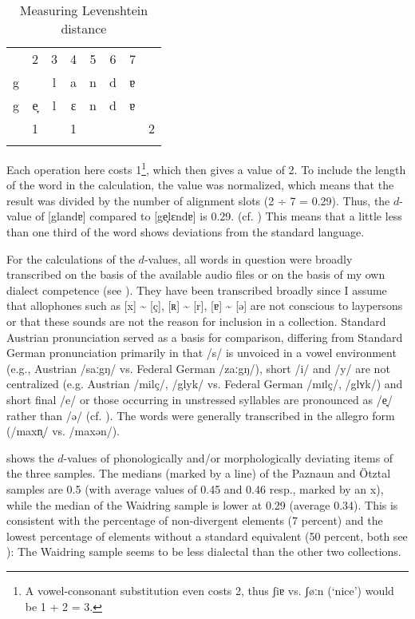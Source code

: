 \documentclass[output=paper]{langscibook}
\begin{document}
\begin{table}
\begin{tabular}{cccccccc}
\lsptoprule
1 & 2 & 3 & 4 & 5 & 6 & 7 & \\
g &  & l & a & n & d & ɐ & \\
g & e̞ & l & ɛ & n & d & ɐ & \\
\midrule
& 1 &  & 1 &  &  &  & 2\\
\lspbottomrule
\end{tabular}
\caption{\label{tab:kathrein:8} Measuring Levenshtein distance}
\end{table}

Each operation here costs 1\footnote{A vowel-consonant substitution even costs 2, thus ʃiɐ vs. ʃøːn (‘nice’) would be 1 + 2 = 3.}, which then gives a value of 2. To include the length of the word in the calculation, the value was normalized, which means that the result was divided by the number of alignment slots (2 ÷ 7 = 0.29). Thus, the $d$-value of [glandɐ] compared to [ge̞lɛndɐ] is 0.29. (cf. \citealt{BeijeringEtAl2008}) This means that a little less than one third of the word shows deviations from the standard language.

For the calculations of the $d$-values, all words in question were broadly transcribed on the basis of the available audio files or on the basis of my own dialect competence (see ). They have been transcribed broadly since I assume that allophones such as [x] {\textasciitilde} [ç], [ʀ] {\textasciitilde} [r], [ɐ] {\textasciitilde} [ə] are not conscious to laypersons or that these sounds are not the reason for inclusion in a collection. Standard Austrian pronunciation served as a basis for comparison, differing from Standard German pronunciation primarily in that /s/ is unvoiced in a vowel environment (e.g., Austrian /saːgŋ/ vs. Federal German /zaːgŋ/), short /i/ and /y/ are not centralized (e.g. Austrian /milç/, /glyk/ vs. Federal German /mɪlç/, /glʏk/) and short final /e/ or those occurring in unstressed syllables are pronounced as /e̞/ rather than /ə/ (cf. \citealt{Wiesinger2009}). The words were generally transcribed in the allegro form (/maxn̩/ vs. /maxən/).

 shows the $d$-values of phonologically and/or morphologically deviating items of the three samples. The medians (marked by a line) of the Paznaun and Ötztal samples are 0.5 (with average values of 0.45 and 0.46 resp., marked by an x), while the median of the Waidring sample is lower at 0.29 (average 0.34). This is consistent with the percentage of non-divergent elements (7 percent) and the lowest percentage of elements without a standard equivalent (50 percent, both see ): The Waidring sample seems to be less dialectal than the other two collections.
\end{document}

